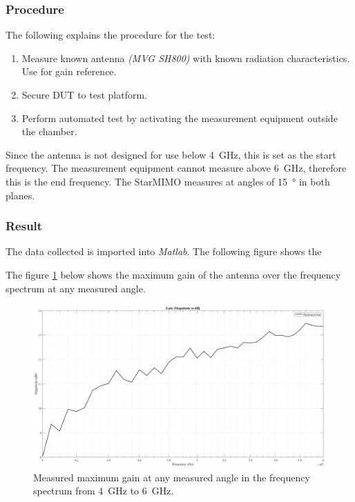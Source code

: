\subsubsection{Procedure}
The following explains the procedure for the test:
\begin{enumerate}
    \item Measure known antenna \textit{(MVG SH800)} with known radiation characteristics. Use for gain reference.
    \item Secure DUT to test platform.
    \item Perform automated test by activating the measurement equipment outside the chamber.
\end{enumerate}
Since the antenna is not designed for use below \SI{4}{\giga\hertz}, this is set as the start frequency. The measurement equipment cannot measure above \SI{6}{\giga\hertz}, therefore this is the end frequency. The StarMIMO measures at angles of \SI{15}{\degree} in both planes.

\subsubsection{Result}
The data collected is imported into \textit{Matlab}. The following figure shows the

The figure \ref{fig:gain_meas} below shows the maximum gain of the antenna over the frequency spectrum at any measured angle.
\begin{figure}[H]
    \centering
    \includegraphics[width=1\textwidth]{figures/gain_meas.png}
    \caption{Measured maximum gain at any measured angle in the frequency spectrum from \SI{4}{\giga\hertz} to \SI{6}{\giga\hertz}.} \label{fig:gain_meas}
\end{figure}

